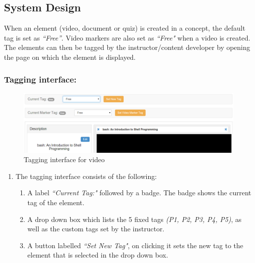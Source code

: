 \subsection{System Design}

When an element (video, document or quiz) is created in a concept, the default tag is set as \textit{``Free''}. Video markers are also set as \textit{``Free"} when a video is created. The elements can then be tagged by the instructor/content developer by opening the page on which the element is displayed.

\subsubsection*{Tagging interface:}

\begin{figure}[h]
\centering
\includegraphics[width=1\linewidth]{./media/tagging_interface}
\caption{Tagging interface for video}
\label{fig:tagging_interface}
\end{figure}

\begin{enumerate}
	\item The tagging interface consists of the following:
	\begin{enumerate}
		\item A label \textit{``Current Tag:"} followed by a badge. The badge shows the current tag of the element.
		\item A drop down box which lists the 5 fixed tags \textit{(P1, P2, P3, P4, P5)}, as well as the custom tags set by the instructor.
		\item A button labelled \textit{``Set New Tag"}, on clicking it sets the new tag to the element that is selected in the drop down box.
	\end{enumerate}

\end{enumerate}

